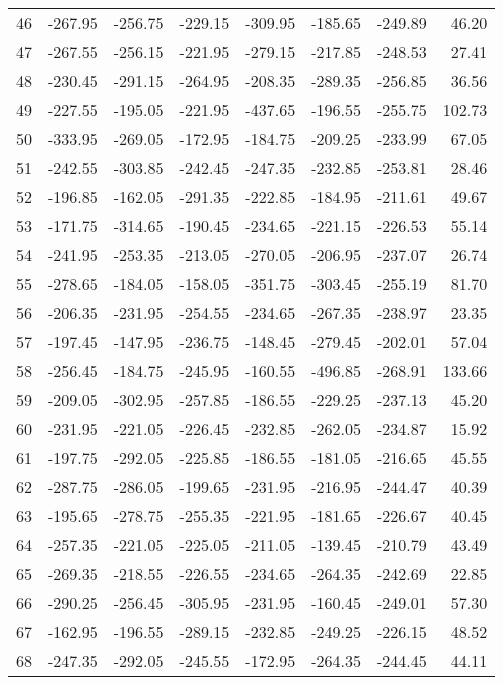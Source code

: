 \begin{longtable}{rrrrrrrr}
46 & -267.95 & -256.75 & -229.15 & -309.95 & -185.65 & -249.89 & 46.20  \\
47 & -267.55 & -256.15 & -221.95 & -279.15 & -217.85 & -248.53 & 27.41  \\
48 & -230.45 & -291.15 & -264.95 & -208.35 & -289.35 & -256.85 & 36.56  \\
49 & -227.55 & -195.05 & -221.95 & -437.65 & -196.55 & -255.75 & 102.73  \\
50 & -333.95 & -269.05 & -172.95 & -184.75 & -209.25 & -233.99 & 67.05  \\
51 & -242.55 & -303.85 & -242.45 & -247.35 & -232.85 & -253.81 & 28.46  \\
52 & -196.85 & -162.05 & -291.35 & -222.85 & -184.95 & -211.61 & 49.67  \\
53 & -171.75 & -314.65 & -190.45 & -234.65 & -221.15 & -226.53 & 55.14  \\
54 & -241.95 & -253.35 & -213.05 & -270.05 & -206.95 & -237.07 & 26.74  \\
55 & -278.65 & -184.05 & -158.05 & -351.75 & -303.45 & -255.19 & 81.70  \\
56 & -206.35 & -231.95 & -254.55 & -234.65 & -267.35 & -238.97 & 23.35  \\
57 & -197.45 & -147.95 & -236.75 & -148.45 & -279.45 & -202.01 & 57.04  \\
58 & -256.45 & -184.75 & -245.95 & -160.55 & -496.85 & -268.91 & 133.66  \\
59 & -209.05 & -302.95 & -257.85 & -186.55 & -229.25 & -237.13 & 45.20  \\
60 & -231.95 & -221.05 & -226.45 & -232.85 & -262.05 & -234.87 & 15.92  \\
61 & -197.75 & -292.05 & -225.85 & -186.55 & -181.05 & -216.65 & 45.55  \\
62 & -287.75 & -286.05 & -199.65 & -231.95 & -216.95 & -244.47 & 40.39  \\
63 & -195.65 & -278.75 & -255.35 & -221.95 & -181.65 & -226.67 & 40.45  \\
64 & -257.35 & -221.05 & -225.05 & -211.05 & -139.45 & -210.79 & 43.49  \\
65 & -269.35 & -218.55 & -226.55 & -234.65 & -264.35 & -242.69 & 22.85  \\
66 & -290.25 & -256.45 & -305.95 & -231.95 & -160.45 & -249.01 & 57.30  \\
67 & -162.95 & -196.55 & -289.15 & -232.85 & -249.25 & -226.15 & 48.52  \\
68 & -247.35 & -292.05 & -245.55 & -172.95 & -264.35 & -244.45 & 44.11  \\

\end{longtable}
